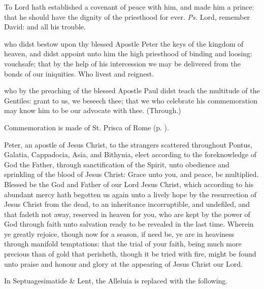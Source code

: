 \introit
{} To Lord hath established a covenant of peace with him, and made him a prince: that he should have the dignity of the priesthood for ever. \textit{Ps.} Lord, remember David: and all his trouble.

\collect
{} who didst bestow upon thy blessed Apostle Peter the keys of the kingdom of heaven, and didst appoint unto him the high priesthood of binding and loosing: vouchsafe; that by the help of his intercession we may be delivered from the bonds of our iniquities. Who livest and reignest.

 who by the preaching of the blessed Apostle Paul didst teach the multitude of the Gentiles: grant to us, we beseech thee; that we who celebrate his commemoration may know him to be our advocate with thee. (Through.)

\begin{rubric}
    Commemoration is made of St. Prisca of Rome (p. \pageref{PriscaCollect}).
\end{rubric}

 Peter, an apostle of Jesus Christ, to the strangers scattered throughout Pontus, Galatia, Cappadocia, Asia, and Bithynia, elect according to the foreknowledge of God the Father, through sanctification of the Spirit, unto obedience and sprinkling of the blood of Jesus Christ: Grace unto you, and peace, be multiplied. Blessed be the God and Father of our Lord Jesus Christ, which according to his abundant mercy hath begotten us again unto a lively hope by the resurrection of Jesus Christ from the dead, to an inheritance incorruptible, and undefiled, and that fadeth not away, reserved in heaven for you, who are kept by the power of God through faith unto salvation ready to be revealed in the last time. Wherein ye greatly rejoice, though now for a season, if need be, ye are in heaviness through manifold temptations: that the trial of your faith, being much more precious than of gold that perisheth, though it be tried with fire, might be found unto praise and honour and glory at the appearing of Jesus Christ our Lord.


\begin{rubric}
	In Septuagesimatide \& Lent, the Alleluia is replaced with the following.
\end{rubric}

